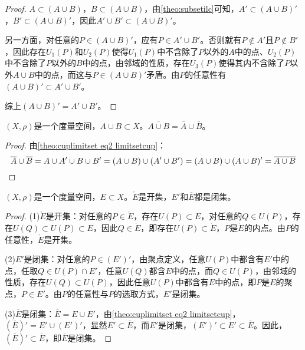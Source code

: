 \begin{proof}
	$A\subset (A\cup B)$，$B\subset (A\cup B)$，由\cref{theo:subsetilc}可知，$A'\subset(A\cup B)'$，$B'\subset(A\cup B)'$，因此$A'\cup B'\subset(A\cup B)'$。\par
	另一方面，对任意的$ P\in (A\cup B)'$，应有$P\in A'\cup B'$。否则就有$P\notin A'$且$P\notin B'$，因此存在$U_1(P)$和$U_2(P)$使得$U_1(P)$中不含除了$P$以外的$A$中的点、$U_2(P)$中不含除了$P$以外的$B$中的点，由邻域的性质，存在$U_3(P)$使得其内不含除了$P$以外$A\cup B$中的点，而这与$P\in (A\cup B)'$矛盾。由$P$的任意性有$(A\cup B)'\subset A'\cup B'$。\par
	综上$(A\cup B)'=A'\cup B'$。
\end{proof}
\begin{theorem}
	$(X,\rho)$是一个度量空间，$A\cup B\subset X$。$\overline{A\cup B}=\overline{A}\cup \overline{B}$。
\end{theorem}
\begin{proof}
	由\cref{theo:cuplimitset eq2 limitsetcup}：
	\begin{equation*}
		\overline{A}\cup \overline{B}=A\cup A'\cup B\cup B'
		=(A\cup B)\cup(A'\cup B')=(A\cup B)\cup(A\cup B)'
		=\overline{A\cup B}\qedhere
	\end{equation*}
\end{proof}
\begin{theorem}\label{theo:InteriorOpenSet LimitsetClosureClosedset}
	$(X,\rho)$是一个度量空间，$E\subset X$。$\mathring{E}$是开集，$E'$和$\overline{E}$都是闭集。
\end{theorem}
\begin{proof}
	(1)$\mathring{E}$是开集：对任意的$ P\in\mathring{E}$，存在$U(P)\subset E$，对任意的$ Q\in U(P)$，存在$U(Q)\subset U(P)\subset E$，因此$Q\in\mathring{E}$，即存在$U(P)\subset\mathring{E}$，$P$是$\mathring{E}$的内点。由$P$的任意性，$\mathring{E}$是开集。\par
	(2)$E'$是闭集：对任意的$ P\in (E')'$，由聚点定义，任意$U(P)$中都含有$E'$中的点，任取$Q\in U(P)\cap E'$，任意$U(Q)$都含$E$中的点，而$Q\in U(P)$，由邻域的性质，存在$U(Q)\subset U(P)$，因此任意$U(P)$中都含有$E$中的点，即$P$是$E$的聚点，$P\in E'$。由$P$的任意性与$P$的选取方式，$E'$是闭集。\par
	(3)$\overline{E}$是闭集：$\overline{E}=E\cup E'$，由\cref{theo:cuplimitset eq2 limitsetcup}，$(\overline{E})'=E'\cup (E')'$，显然$E'\subset \overline{E}$，而$E'$是闭集，$(E')'\subset E'\subset\overline{E}$。因此，$(\overline{E})'\subset\overline{E}$，即$\overline{E}$是闭集。
\end{proof}
